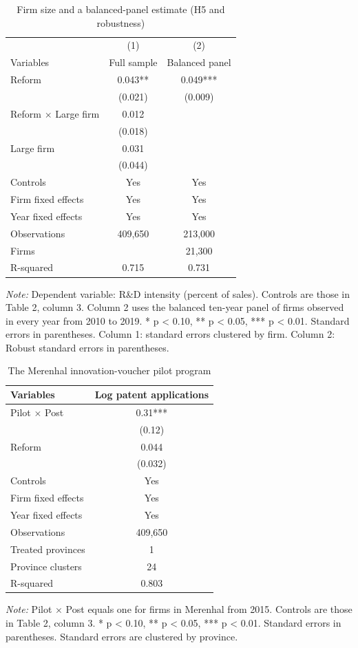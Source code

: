 \documentclass[12pt]{article}
\newcommand{\tabnote}[1]{\par\vspace{2pt}\begin{minipage}{\linewidth}\footnotesize\setstretch{1.0}\textit{Note:} #1\end{minipage}}
\begin{document}
\begin{table}[!htbp]
\centering
\begin{threeparttable}
\caption{Firm size and a balanced-panel estimate (H5 and robustness)}
\small
{}
\begin{tabular}{lcc}
\toprule
 & (1) & (2) \\
Variables & Full sample & Balanced panel \\
\midrule
Reform & 0.043** & 0.049*** \\
 & (0.021) & (0.009) \\
Reform $\times$ Large firm & 0.012 & \\
 & (0.018) & \\
Large firm & 0.031 & \\
 & (0.044) & \\
\midrule
Controls & Yes & Yes \\
Firm fixed effects & Yes & Yes \\
Year fixed effects & Yes & Yes \\
Observations & 409,650 & 213,000 \\
Firms & & 21,300 \\
R-squared & 0.715 & 0.731 \\
\bottomrule
\end{tabular}
\tabnote{Dependent variable: R\&D intensity (percent of sales). Controls are those in Table 2, column 3. Column 2 uses the balanced ten-year panel of firms observed in every year from 2010 to 2019. * p < 0.10, ** p < 0.05, *** p < 0.01. Standard errors in parentheses. Column 1: standard errors clustered by firm. Column 2: Robust standard errors in parentheses.}
\end{threeparttable}
\end{table}

\begin{table}[!htbp]
\centering
\begin{threeparttable}
\caption{The Merenhal innovation-voucher pilot program}
\small
{}
\begin{tabular}{lc}
\toprule
Variables & Log patent applications \\
\midrule
Pilot $\times$ Post & 0.31*** \\
 & (0.12) \\
Reform & 0.044 \\
 & (0.032) \\
\midrule
Controls & Yes \\
Firm fixed effects & Yes \\
Year fixed effects & Yes \\
Observations & 409,650 \\
Treated provinces & 1 \\
Province clusters & 24 \\
R-squared & 0.803 \\
\bottomrule
\end{tabular}
\tabnote{Pilot $\times$ Post equals one for firms in Merenhal from 2015. Controls are those in Table 2, column 3. * p < 0.10, ** p < 0.05, *** p < 0.01. Standard errors in parentheses. Standard errors are clustered by province.}
\end{threeparttable}
\end{table}
\end{document}
